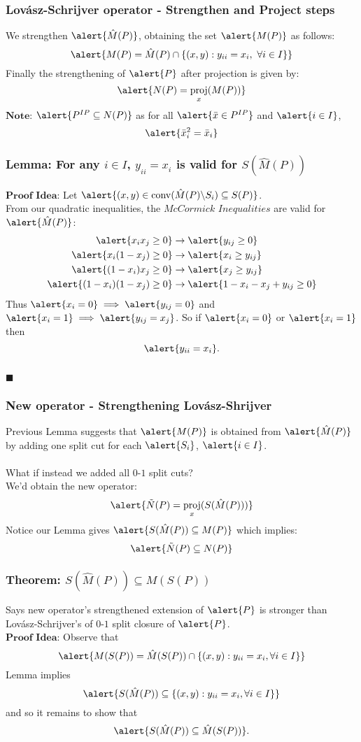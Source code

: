 \documentclass{beamer}
\DeclareMathOperator{\conv}{conv}
\DeclareMathOperator{\proj}{proj}
\begin{document}
\begin{frame}
\frametitle{Lov\'asz-Schrijver operator - Strengthen and Project steps}
We strengthen $\alert{\hat{M}(P)}$, obtaining the set $\alert{M(P)}$ as follows:
$$\alert{M(P) = \hat{M}(P) \cap \{ (x,y) : y_{ii} = x_{i},\ \forall i \in I\} } $$
Finally the strengthening of $\alert{P}$ after projection is given by:
$$\alert{N(P) = \proj_x(M(P))}$$
$\textbf{Note:}$ $\alert{P^{IP} \subseteq N(P)}$ as for all $\alert{\bar{x} \in P^{IP}}$ and $\alert{i \in I}$, 
$$\alert{\bar{x}_i^2 = \bar{x}_i}$$
\end{frame}

\begin{frame}
\frametitle{Lemma: For any $i\in I$, $y_{ii} = x_{i}$ is valid for $S(\hat{M}(P))$} 
$\textbf{Proof Idea:}$ Let $\alert{(x,y) \in \conv(\hat{M}(P) \backslash S_i) \subseteq S(P)}$.\\ From our quadratic inequalities, the $\textit{McCormick Inequalities}$ are valid for $\alert{\hat{M}(P)}$:
\begin{align*}
\alert{x_i x_j \geq 0} & \rightarrow \alert{y_{ij} \geq 0} \\
\alert{x_i(1-x_j)\geq 0} & \rightarrow \alert{x_i \geq y_{ij}} \\
\alert{(1-x_i)x_j \geq 0} & \rightarrow \alert{x_j \geq y_{ij}} \\
\alert{(1-x_i)(1-x_j) \geq 0} & \rightarrow \alert{1 - x_i - x_j + y_{ij}  \geq 0}
\end{align*}
Thus $\alert{x_i = 0} \implies \alert{y_{ij} = 0}$ and $\alert{x_i = 1} \implies \alert{y_{ij} = x_j}$. So if $\alert{x_i = 0}$ or $\alert{x_i = 1}$ then
$$\alert{y_{ii} = x_i}.$$ \\$\blacksquare$
\end{frame}

\begin{frame}
\frametitle{New operator - Strengthening Lov\'asz-Shrijver}
Previous Lemma suggests that $\alert{M(P)}$ is obtained from $\alert{\hat{M}(P)}$ by adding one split cut for each $\alert{S_i}$, $\alert{i \in I}$.\\\ \\
What if instead we added all $0$-$1$ split cuts?\\
We'd obtain the new operator:
$$\alert{\tilde{N}(P) = \proj_x(S(\hat{M}(P)))}$$
Notice our Lemma gives $\alert{S(\hat{M}(P)) \subseteq M(P)}$ which implies:
$$\alert{\tilde{N}(P) \subseteq N(P)}$$
\end{frame}

\begin{frame}
\frametitle{Theorem: $S(\hat{M}(P)) \subseteq M(S(P))$}
Says new operator's strengthened extension of $\alert{P}$ is stronger than Lov\'asz-Schrijver's of $0$-$1$ split closure of $\alert{P}$.
\\$\textbf{Proof Idea:}$ Observe that $$\alert{M(S(P)) = \hat{M}(S(P)) \cap \{(x,y):y_{ii} = x_i, \forall i \in I\}}$$
Lemma implies $$\alert{S(\hat{M}(P)) \subseteq \{(x,y):y_{ii}=x_i, \forall i \in I \}}$$  and so it remains to show that $$\alert{S(\hat{M}(P)) \subseteq \hat{M}(S(P))}.$$ 
\end{frame}
\end{document}
